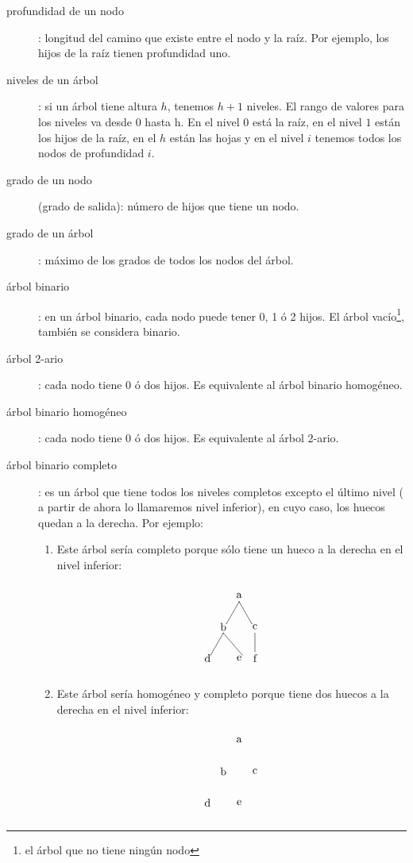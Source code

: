 \documentclass[10pt,a4paper,spanish]{report}
\begin{document}
\begin{description}
\item[profundidad de un nodo]: longitud del camino que existe entre el nodo y la raíz. Por ejemplo, los hijos de la raíz tienen profundidad uno.

\item[niveles de un árbol]: si un árbol tiene altura $h$, tenemos $h+1$ niveles. El rango de valores para los niveles va desde 0 hasta h. En el nivel $0$ está la raíz, en el nivel $1$ están los hijos de la raíz, en el $h$ están las hojas y en el nivel $i$ tenemos todos los nodos de profundidad $i$.

\item[grado de un nodo](grado de salida): número de hijos que tiene un nodo.

\item[grado de un árbol]: máximo de los grados de todos los nodos del árbol.

\item[árbol binario]: en un árbol binario, cada nodo puede tener 0, 1 ó 2 hijos. El árbol vacío\footnote{el árbol que no tiene ningún nodo}, también se considera binario.

\item[árbol 2-ario]: cada nodo tiene 0 ó dos hijos. Es equivalente al árbol binario homogéneo.

\item[árbol binario homogéneo]: cada nodo tiene 0 ó dos hijos. Es equivalente al árbol 2-ario.

\item[árbol binario completo]: es un árbol que tiene todos los niveles completos excepto el último nivel ( a partir de ahora lo llamaremos nivel inferior),  en cuyo caso, los huecos quedan a la derecha. Por ejemplo:
\begin{enumerate}[1.]
\item Este árbol sería completo porque sólo tiene un hueco a la derecha en el nivel inferior:
\[\begin{xy}
,(0,0)*+=<10mm>[]\txt<2cm>{a}
,(-5,-10)*+=<10mm>[]\txt<2cm>{b}
,(5,-10)*+=<10mm>[]\txt<2cm>{c}
,(-10,-20)*+=<10mm>[]\txt<2cm>{d}
,(0,-20)*+=<10mm>[]\txt<2cm>{e}
,(5,-20)*+=<10mm>[]\txt<2cm>{f}

\ar@{-} (0,-2);(-4,-9)
\ar@{-} (0,-2);(4,-9)
\ar@{-} (-5,-12);(-9,-19)
\ar@{-} (-5,-12);(1,-19)
\ar@{-} (5,-12);(5,-18)
\end{xy}\]

\item Este árbol sería homogéneo y completo porque tiene dos huecos a la derecha en el nivel inferior:
\[\begin{xy}
,(0,0)*+=<10mm>[]\txt<2cm>{a}
,(-5,-10)*+=<10mm>[]\txt<2cm>{b}
,(5,-10)*+=<10mm>[]\txt<2cm>{c}
,(-10,-20)*+=<10mm>[]\txt<2cm>{d}
,(0,-20)*+=<10mm>[]\txt<2cm>{e}


\end{xy}\]
\end{enumerate}
\end{description}
\end{document}
